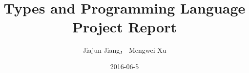 \documentclass[a4paper,11pt]{article}
\begin{document}
    \title{Types and Programming Language Project Report}
    \author{Jiajun Jiang， Mengwei Xu}
    \date{2016-06-5}
    \maketitle
    













 
\end{document}
